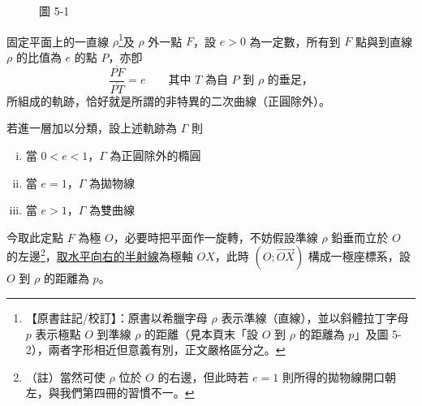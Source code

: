\begin{figure}[H]
\centering
{}
\caption*{圖 5-1}
\label{fig:b5-5-1}
\end{figure}

固定平面上的一直線 $\rho$\label{note:b5-ch1-p46-rho}\footnote{【原書註記/校訂】：原書以希臘字母 $\rho$ 表示準線（直線），並以斜體拉丁字母 $p$ 表示極點 $O$ 到準線 $\rho$ 的距離（見本頁末「設 $O$ 到 $\rho$ 的距離為 $p$」及圖 5-2），兩者字形相近但意義有別，正文嚴格區分之。}及 $\rho$ 外一點 $F$，設 $e > 0$ 為一定數，所有到 $F$ 點與到直線 $\rho$ 的比值為 $e$ 的點 $P$，亦卽
\[
  \frac{\overline{PF}}{\overline{PT}} = e \qquad \text{其中 $T$ 為自 $P$ 到 $\rho$ 的垂足，}
\]
所組成的軌跡，恰好就是所謂的非特異的二次曲線（正圓除外）。

若進一層加以分類，設上述軌跡為 $\Gamma$ 則
\begin{enumerate}[(i)]
  \item 當 $0 < e < 1$，$\Gamma$ 為正圓除外的橢圓
  \item 當 $e = 1$，$\Gamma$ 為拋物線
  \item 當 $e > 1$，$\Gamma$ 為雙曲線
\end{enumerate}

今取此定點 $F$ 為極 $O$，必要時把平面作一旋轉，不妨假設準線 $\rho$ 鉛垂而立於 $O$ 的左邊\footnote{（註）當然可使 $\rho$ 位於 $O$ 的右邊，但此時若 $e = 1$ 則所得的拋物線開口朝左，與我們第四冊的習慣不一。}，\underline{取水平向右的半射線}為極軸 $OX$，此時 $(O; \vec{OX})$ 構成一極座標系，設 $O$ 到 $\rho$ 的距離為 $p$。

